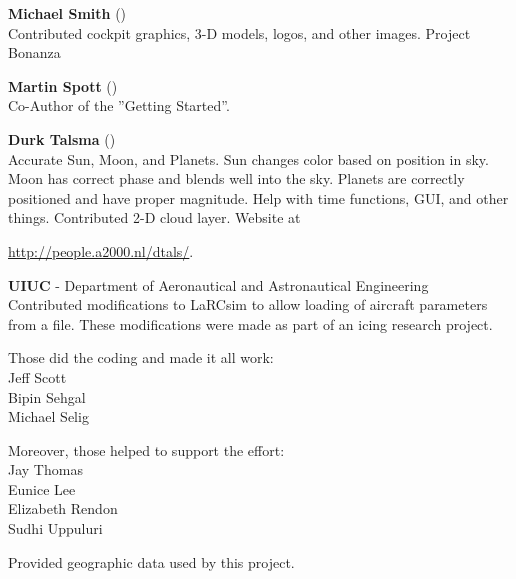 \noindent \textbf{Michael Smith} ()\\
  Contributed cockpit graphics, 3-D models, logos, and other images.
  Project Bonanza
   \medskip

\noindent \textbf{Martin Spott} ()\\
  Co-Author of the ''Getting Started''.
  \medskip

\noindent \textbf{Durk Talsma} ()\\
  Accurate Sun, Moon, and Planets.  Sun changes color based on
  position in sky. Moon has correct phase and blends well into the
  sky.  Planets are correctly positioned and have proper magnitude. Help with time
  functions, GUI, and other things. Contributed 2-D cloud layer. Website
  at
   \medskip

 \href{http://people.a2000.nl/dtals/}{http://people.a2000.nl/dtals/}.
 \medskip

\noindent \textbf{UIUC} - Department of Aeronautical and Astronautical
Engineering\\
  Contributed modifications to LaRCsim to allow loading of aircraft
  parameters from a file.  These modifications were made as part of an
  icing research project.
  \medskip

  Those did the coding and made it all work:\\
      Jeff Scott \\
      Bipin Sehgal \\
      Michael Selig 
  \medskip

  Moreover, those helped to support the effort:\\
      Jay Thomas \\
      Eunice Lee \\
      Elizabeth Rendon \\
      Sudhi Uppuluri 
  \medskip


\noindent
 \textbf{}
  \medskip

  Provided geographic data used by this project.
 \medskip

